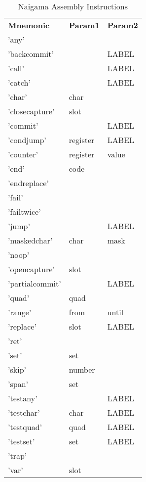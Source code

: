 
\begin{table}[]
\centering
\caption{Naigama Assembly Instructions}
\label{tab:naig_assembly}
\begin{tabular}{lll}
\textbf{Mnemonic} & \textbf{Param1} & \textbf{Param2} \\
'any' &  &  \\
'backcommit' &  & LABEL \\
'call' &  & LABEL \\
'catch' &  & LABEL \\
'char' & char &  \\
'closecapture' & slot &  \\
'commit' &  & LABEL \\
'condjump' & register & LABEL \\
'counter' & register & value \\
'end' & code &  \\
'endreplace' &  &  \\
'fail' &  &  \\
'failtwice' &  &  \\
'jump' &  & LABEL \\
'maskedchar' & char & mask \\
'noop' &  &  \\
'opencapture' & slot &  \\
'partialcommit' &  & LABEL \\
'quad' & quad &  \\
'range' & from & until \\
'replace' & slot & LABEL \\
'ret' &  &  \\
'set' & set &  \\
'skip' & number &  \\
'span' & set &  \\
'testany' &  & LABEL \\
'testchar' & char & LABEL \\
'testquad' & quad & LABEL \\
'testset' & set & LABEL \\
'trap' &  &  \\
'var' & slot &  \\
\end{tabular}
\end{table}
